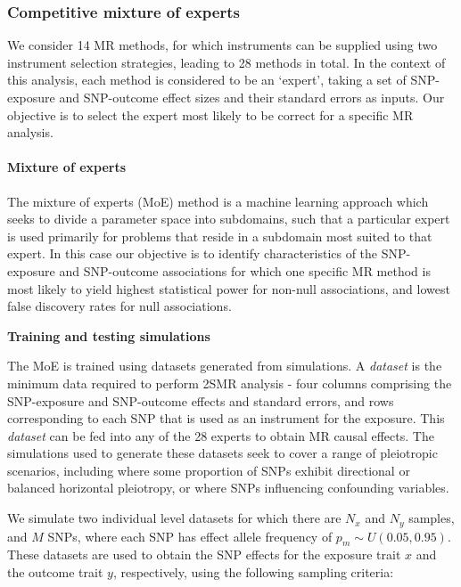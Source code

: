 \documentclass[]{article}
\let\oldparagraph\paragraph
\renewcommand{\paragraph}[1]{\oldparagraph{#1}\mbox{}}
\begin{document}
\subsubsection{Competitive mixture of
experts}\label{competitive-mixture-of-experts}

We consider 14 MR methods, for which instruments can be supplied using
two instrument selection strategies, leading to 28 methods in total. In
the context of this analysis, each method is considered to be an
`expert', taking a set of SNP-exposure and SNP-outcome effect sizes and
their standard errors as inputs. Our objective is to select the expert
most likely to be correct for a specific MR analysis.

\paragraph{Mixture of experts}\label{mixture-of-experts}

The mixture of experts (MoE) method is a machine learning approach which
seeks to divide a parameter space into subdomains, such that a
particular expert is used primarily for problems that reside in a
subdomain most suited to that expert. In this case our objective is to
identify characteristics of the SNP-exposure and SNP-outcome
associations for which one specific MR method is most likely to yield
highest statistical power for non-null associations, and lowest false
discovery rates for null associations.

\textbf{Training and testing simulations}

The MoE is trained using datasets generated from simulations. A
\emph{dataset} is the minimum data required to perform 2SMR analysis -
four columns comprising the SNP-exposure and SNP-outcome effects and
standard errors, and rows corresponding to each SNP that is used as an
instrument for the exposure. This \emph{dataset} can be fed into any of
the 28 experts to obtain MR causal effects. The simulations used to
generate these datasets seek to cover a range of pleiotropic scenarios,
including where some proportion of SNPs exhibit directional or balanced
horizontal pleiotropy, or where SNPs influencing confounding variables.

We simulate two individual level datasets for which there are \(N_x\)
and \(N_y\) samples, and \(M\) SNPs, where each SNP has effect allele
frequency of \(p_m \sim U(0.05, 0.95)\). These datasets are used to
obtain the SNP effects for the exposure trait \(x\) and the outcome
trait \(y\), respectively, using the following sampling criteria:
\end{document}
